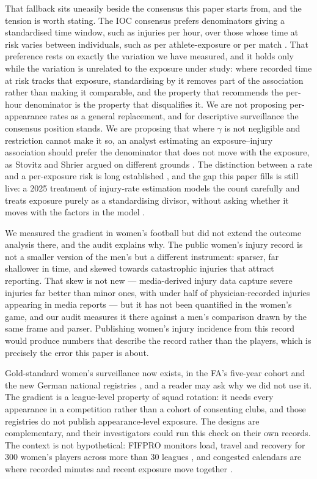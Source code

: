 \documentclass[11pt]{article}
\begin{document}
That fallback sits uneasily beside the consensus this paper starts from, and the tension is worth stating. The IOC consensus prefers denominators giving a standardised time window, such as injuries per hour, over those whose time at risk varies between individuals, such as per athlete-exposure or per match \cite{bahr2020ioc}. That preference rests on exactly the variation we have measured, and it holds only while the variation is unrelated to the exposure under study: where recorded time at risk tracks that exposure, standardising by it removes part of the association rather than making it comparable, and the property that recommends the per-hour denominator is the property that disqualifies it. We are not proposing per-appearance rates as a general replacement, and for descriptive surveillance the consensus position stands. We are proposing that where $\gamma$ is not negligible and restriction cannot make it so, an analyst estimating an exposure--injury association should prefer the denominator that does not move with the exposure, as Stovitz and Shrier argued on different grounds \cite{stovitz2012_exposure_time}. The distinction between a rate and a per-exposure risk is long established \cite{knowles2006_risks_and_rates}, and the gap this paper fills is still live: a 2025 treatment of injury-rate estimation models the count carefully and treats exposure purely as a standardising divisor, without asking whether it moves with the factors in the model \cite{chandran2025_bayesian_injury_rates}.

We measured the gradient in women's football but did not extend the outcome analysis there, and the audit explains why. The public women's injury record is not a smaller version of the men's but a different instrument: sparser, far shallower in time, and skewed towards catastrophic injuries that attract reporting. That skew is not new --- media-derived injury data capture severe injuries far better than minor ones, with under half of physician-recorded injuries appearing in media reports \cite{krutsch2020media_validity,szymski2021_media_helpful} --- but it has not been quantified in the women's game, and our audit measures it there against a men's comparison drawn by the same frame and parser. Publishing women's injury incidence from this record would produce numbers that describe the record rather than the players, which is precisely the error this paper is about.

Gold-standard women's surveillance now exists, in the FA's five-year cohort \cite{sprouse2025_fa_womens_surveillance} and the new German national registries \cite{huber2026_german_registries}, and a reader may ask why we did not use it. The gradient is a league-level property of squad rotation: it needs every appearance in a competition rather than a cohort of consenting clubs, and those registries do not publish appearance-level exposure. The designs are complementary, and their investigators could run this check on their own records. The context is not hypothetical: FIFPRO monitors load, travel and recovery for 300 women's players across more than 30 leagues \cite{fifpro2025_womens_workload}, and congested calendars are where recorded minutes and recent exposure move together \cite{bengtsson2013congestion}.
\end{document}

